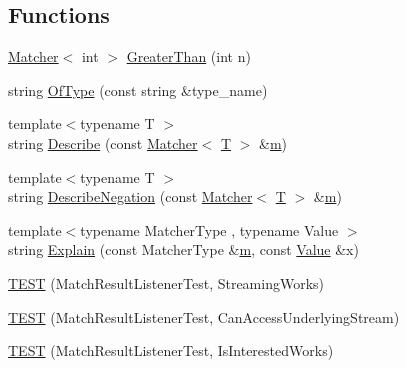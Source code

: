 \subsection*{Functions}
\begin{DoxyCompactItemize}
\item 
\hyperlink{classtesting_1_1_matcher}{Matcher}$<$ int $>$ \hyperlink{namespacetesting_1_1gmock__matchers__test_a8cf8614a7c9adc8fb00e8af04895f97c}{Greater\+Than} (int n)
\item 
string \hyperlink{namespacetesting_1_1gmock__matchers__test_a5d48d2ef7ca374de369c5f0a30e32343}{Of\+Type} (const string \&type\+\_\+name)
\item 
{\footnotesize template$<$typename T $>$ }\\string \hyperlink{namespacetesting_1_1gmock__matchers__test_a36ae44e4f6c8e9fe3fe9162132503717}{Describe} (const \hyperlink{classtesting_1_1_matcher}{Matcher}$<$ \hyperlink{functions__7_8js_adf1f3edb9115acb0a1e04209b7a9937b}{T} $>$ \&\hyperlink{variables__e_8js_aab4247b6acebcba996939b177f483c14}{m})
\item 
{\footnotesize template$<$typename T $>$ }\\string \hyperlink{namespacetesting_1_1gmock__matchers__test_afbc8022da5a58aa467ec414ab3e90908}{Describe\+Negation} (const \hyperlink{classtesting_1_1_matcher}{Matcher}$<$ \hyperlink{functions__7_8js_adf1f3edb9115acb0a1e04209b7a9937b}{T} $>$ \&\hyperlink{variables__e_8js_aab4247b6acebcba996939b177f483c14}{m})
\item 
{\footnotesize template$<$typename Matcher\+Type , typename Value $>$ }\\string \hyperlink{namespacetesting_1_1gmock__matchers__test_a6215aeb6213a03f4233924ef1c74d968}{Explain} (const Matcher\+Type \&\hyperlink{variables__e_8js_aab4247b6acebcba996939b177f483c14}{m}, const \hyperlink{namespacetesting_ae44c50a3a7f0a46f05c8a0b0592b4a62}{Value} \&x)
\item 
\hyperlink{namespacetesting_1_1gmock__matchers__test_a7bc21ec910c3861034d1336fecfcc260}{T\+E\+ST} (Match\+Result\+Listener\+Test, Streaming\+Works)
\item 
\hyperlink{namespacetesting_1_1gmock__matchers__test_abc02b215e80c57464c83abdf297b9db7}{T\+E\+ST} (Match\+Result\+Listener\+Test, Can\+Access\+Underlying\+Stream)
\item 
\hyperlink{namespacetesting_1_1gmock__matchers__test_ac7ee3826ca24c20fa2a8b388c72eedb2}{T\+E\+ST} (Match\+Result\+Listener\+Test, Is\+Interested\+Works)
\item 

\end{DoxyCompactItemize}
